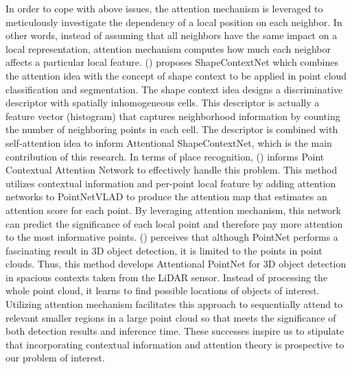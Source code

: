 In order to cope with above issues, the attention mechanism is leveraged to meticulously investigate the dependency of a local position on each neighbor. In other words, instead of assuming that all neighbors have the same impact on a local representation, attention mechanism computes how much each neighbor affects a particular local feature. (\textcolor{cyan}{\cite{xie2018attentional}}) proposes ShapeContextNet which combines the attention idea with the concept of shape context to be applied in point cloud classification and segmentation. The shape context idea designs a discriminative descriptor with spatially inhomogeneous cells. This descriptor is actually a feature vector (histogram) that captures neighborhood information by counting the number of neighboring points in each cell. The descriptor is combined with self-attention idea to inform Attentional ShapeContextNet, which is the main contribution of this research. In terms of place recognition, (\textcolor{cyan}{\cite{zhang2019pcan}}) informs Point Contextual Attention Network to effectively handle this problem. This method utilizes contextual information and per-point local feature by adding attention networks to PointNetVLAD to produce the attention map that estimates an attention score for each point. By leveraging attention mechanism, this network can predict the significance of each local point and therefore pay more attention to the most informative points.  (\textcolor{cyan}{\cite{paigwar2019attentional}}) perceives that although PointNet performs a fascinating result in 3D object detection, it is limited to the points in point clouds. Thus, this method develops Attentional PointNet for 3D object detection in spacious contexts taken from the LiDAR sensor. Instead of processing the whole point cloud, it learns to find possible locations of objects of interest. Utilizing attention mechanism facilitates this approach to sequentially attend to relevant smaller regions in a large point cloud so that meets the significance of both detection results and inference time. These successes inspire us to stipulate that incorporating contextual information and attention theory is prospective to our problem of interest. 